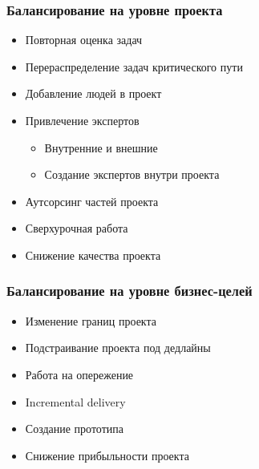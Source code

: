 \documentclass{../../slides-style}
\begin{document}
    \begin{frame}
        \frametitle{Балансирование на уровне проекта}
        \begin{itemize}
            \item Повторная оценка задач
            \item Перераспределение задач критического пути
            \item Добавление людей в проект
            \item Привлечение экспертов
            \begin{itemize}
                \item Внутренние и внешние
                \item Создание экспертов внутри проекта
            \end{itemize}
            \item Аутсорсинг частей проекта
            \item Сверхурочная работа
            \item Снижение качества проекта
        \end{itemize}
    \end{frame}

    \begin{frame}
        \frametitle{Балансирование на уровне бизнес-целей}
        \begin{itemize}
            \item Изменение границ проекта
            \item Подстраивание проекта под дедлайны
            \item Работа на опережение
            \item Incremental delivery
            \item Создание прототипа
            \item Снижение прибыльности проекта
        \end{itemize}
    \end{frame}
\end{document}
